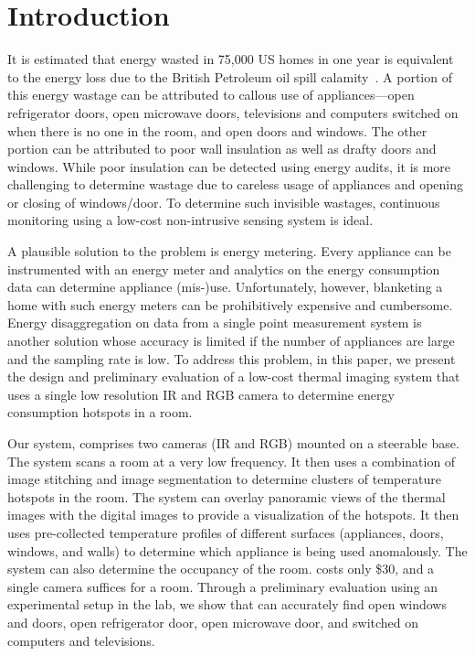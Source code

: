 \section{Introduction}
\label{sec:intro}

It is estimated that energy wasted in 75,000 US homes in one year is equivalent to the energy loss due to the British Petroleum oil
spill calamity~\cite{EIA2014}. A portion of this energy wastage can be attributed to callous use of appliances---open refrigerator doors,
open microwave doors, televisions and computers switched on when there is no one in the room, and open doors and windows. The other
portion can be attributed to poor wall insulation as well as drafty doors and windows. While poor insulation can be detected using
energy audits, it is more challenging to determine wastage due to careless usage of appliances and opening or closing of windows/door.
To determine such invisible wastages, continuous monitoring using a low-cost non-intrusive sensing system is ideal.

A plausible solution to the problem is energy metering. Every appliance can be instrumented with an energy meter and analytics on the
energy consumption data can determine appliance (mis-)use. Unfortunately, however, blanketing a home with such energy meters can be
prohibitively expensive and cumbersome. Energy disaggregation on data from a single point measurement system is another solution 
whose accuracy is limited if the number of appliances are large and the sampling rate is low. To address this problem, in
this paper, we present the design and preliminary evaluation of a low-cost thermal imaging system that uses a single low resolution IR
and RGB camera to determine energy consumption hotspots in a room.

Our system, {\IRLeak} comprises two cameras (IR and RGB) mounted on a steerable base. The system scans a room at a very low frequency.
It then uses a combination of image stitching and image segmentation to determine clusters of temperature hotspots in the room. The
system can overlay panoramic views of the thermal images with the digital images to provide a visualization of the hotspots. It then
uses pre-collected temperature profiles of different surfaces (appliances, doors, windows, and walls) to determine which appliance is
being used anomalously. The system can also determine the occupancy of the room. {\IRLeak} costs only \$30, and a single camera
suffices for a room. Through a preliminary evaluation using an experimental setup in the lab, we show that {\IRLeak} can accurately
find open windows and doors, open refrigerator door, open microwave door, and switched on computers and televisions. 

